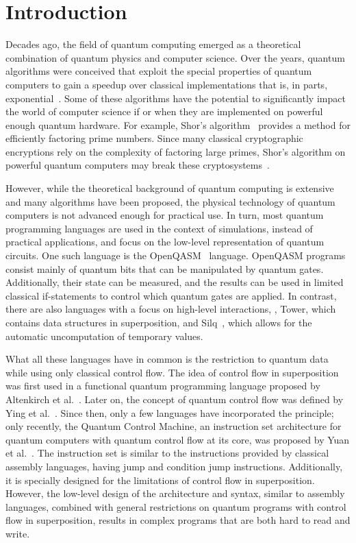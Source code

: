 \chapter{Introduction}
\label{ch:introduction}
Decades ago, the field of quantum computing emerged as a theoretical combination of quantum physics and computer science. Over the years, quantum algorithms were conceived that exploit the special properties of quantum computers to gain a speedup over classical implementations that is, in parts, exponential~\cite{BeVa93}. Some of these algorithms have the potential to significantly impact the world of computer science if or when they are implemented on powerful enough quantum hardware. For example, Shor's algorithm~\cite{Shor97} provides a method for efficiently factoring prime numbers. Since many classical cryptographic encryptions rely on the complexity of factoring large primes, Shor's algorithm on powerful quantum computers may break these cryptosystems~\cite{DiCh20}.

However, while the theoretical background of quantum computing is extensive and many algorithms have been proposed, the physical technology of quantum computers is not advanced enough for practical use. In turn, most quantum programming languages are used in the context of simulations, instead of practical applications, and focus on the low-level representation of quantum circuits. One such language is the OpenQASM~\cite{CBSG17} language. OpenQASM programs consist mainly of quantum bits that can be manipulated by quantum gates. Additionally, their state can be measured, and the results can be used in limited classical if-statements to control which quantum gates are applied. In contrast, there are also languages with a focus on high-level interactions, \eg, Tower\cite{ChMi22}, which contains data structures in superposition, and Silq~\cite{BBGV20}, which allows for the automatic uncomputation of temporary values.

What all these languages have in common is the restriction to quantum data while using only classical control flow. The idea of control flow in superposition was first used in a functional quantum programming language proposed by Altenkirch et al.~\cite{AlGr05}. Later on, the concept of quantum control flow was defined by Ying et al.~\cite{YYF12}. Since then, only a few languages have incorporated the principle; only recently, the Quantum Control Machine, an instruction set architecture for quantum computers with quantum control flow at its core, was proposed by Yuan et al.~\cite{YVC24}.
The instruction set is similar to the instructions provided by classical assembly languages, having jump and condition jump instructions. Additionally, it is specially designed for the limitations of control flow in superposition. However, the low-level design of the architecture and syntax, similar to assembly languages, combined with general restrictions on quantum programs with control flow in superposition, results in complex programs that are both hard to read and write.

